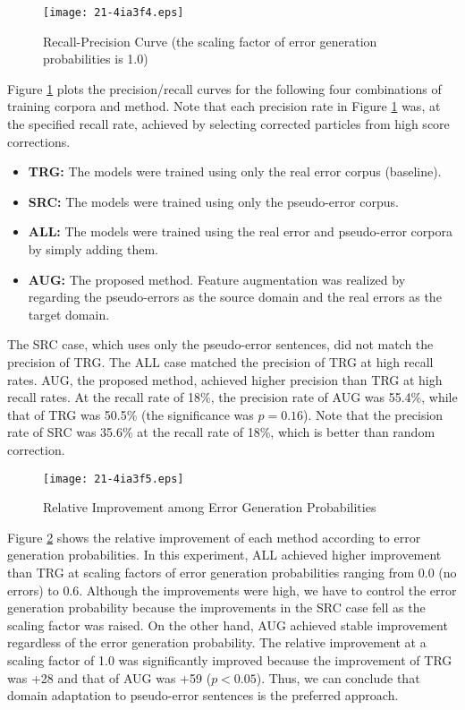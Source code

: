 \documentclass[english]{jnlp_1.4_rep}
\begin{document}
\begin{figure}[b]
\begin{center}
\texttt{[image: 21-4ia3f4.eps]}
\caption{Recall-Precision Curve (the scaling factor of error generation probabilities is 1.0)}
\label{fig-graph1}
\end{center}
\end{figure}

Figure \ref{fig-graph1} plots the precision/recall curves for the
following four combinations of training corpora and method. Note that
each precision rate in Figure \ref{fig-graph1} was, at the specified
recall rate, achieved by selecting corrected particles from high score
corrections.

\begin{itemize}
\item \textbf{TRG:}
The models were trained using only the real error corpus (baseline).

\item \textbf{SRC:}
The models were trained using only the pseudo-error corpus.

\item \textbf{ALL:}
The models were trained using the real error and pseudo-error corpora
by simply adding them.

\item \textbf{AUG:} 
The proposed method.  Feature augmentation was realized by regarding
the pseudo-errors as the source domain and the real errors as the
target domain.
\end{itemize}

The SRC case, which uses only the pseudo-error sentences, did not
match the precision of TRG. The ALL case matched the precision of TRG
at high recall rates. AUG, the proposed method, achieved higher
precision than TRG at high recall rates. At the recall rate of 18\%,
the precision rate of AUG was 55.4\%, while that of TRG was 50.5\%
(the significance was $p = 0.16$). Note that the precision rate of SRC
was 35.6\% at the recall rate of 18\%, which is better than random
correction.

\begin{figure}[t]
\begin{center}
\texttt{[image: 21-4ia3f5.eps]}
\caption{Relative Improvement among Error Generation Probabilities}
\label{fig-graph2}
\end{center}
\end{figure}

Figure \ref{fig-graph2} shows the relative improvement of each method
according to error generation probabilities. In this experiment, ALL
achieved higher improvement than TRG at scaling factors of error
generation probabilities ranging from 0.0 (no errors) to 0.6. Although
the improvements were high, we have to control the error generation
probability because the improvements in the SRC case fell as the
scaling factor was raised. On the other hand, AUG achieved stable
improvement regardless of the error generation probability. The
relative improvement at a scaling factor of 1.0 was significantly
improved because the improvement of TRG was +28 and that of AUG was
+59 ($p < 0.05$). Thus, we can conclude that domain adaptation to
pseudo-error sentences is the preferred approach.
\end{document}
